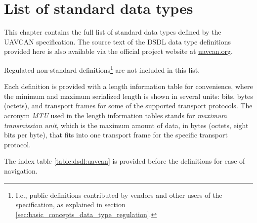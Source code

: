 \chapter{List of standard data types}\label{sec:list_of_standard_data_types}

This chapter contains the full list of standard data types defined by the UAVCAN specification.
The source text of the DSDL data type definitions provided here is also available via the
official project website at \href{http://uavcan.org}{uavcan.org}.

Regulated non-standard definitions\footnote{I.e., public definitions contributed by vendors and other users
of the specification, as explained in section \ref{sec:basic_concepts_data_type_regulation}.}
are not included in this list.

Each definition is provided with a length information table for convenience,
where the minimum and maximum serialized length is shown in several units:
bits, bytes (octets), and transport frames for some of the supported transport protocols.
The acronym \emph{MTU} used in the length information tables stands for
\emph{maximum transmission unit}, which is the maximum amount of data, in bytes (octets, eight bits per byte),
that fits into one transport frame for the specific transport protocol.

The index table \ref{table:dsdl:uavcan} is provided before the definitions for ease of navigation.

\clearpage{}
